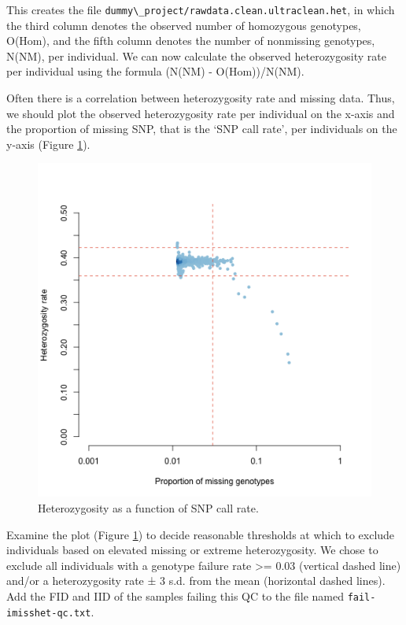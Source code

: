 \documentclass[
]{book}
\newcommand{\passthrough}[1]{#1}
\begin{document}
This creates the file \passthrough{\lstinline!dummy\_project/rawdata.clean.ultraclean.het!}, in which the third column denotes the observed number of homozygous genotypes, O(Hom), and the fifth column denotes the number of nonmissing genotypes, N(NM), per individual. We can now calculate the observed heterozygosity rate per individual using the formula (N(NM) - O(Hom))/N(NM).

Often there is a correlation between heterozygosity rate and missing data. Thus, we should plot the observed heterozygosity rate per individual on the x-axis and the proportion of missing SNP, that is the `SNP call rate', per individuals on the y-axis (Figure \ref{fig:showheterozygosity}).

\begin{figure}[H]

{\centering \includegraphics[width=0.85\linewidth]{img/_gwas_dummy/show-heterozygosity} 

}

\caption{Heterozygosity as a function of SNP call rate.}\label{fig:showheterozygosity}
\end{figure}

Examine the plot (Figure \ref{fig:showheterozygosity}) to decide reasonable thresholds at which to exclude individuals based on elevated missing or extreme heterozygosity. We chose to exclude all individuals with a genotype failure rate \textgreater= 0.03 (vertical dashed line) and/or a heterozygosity rate ± 3 s.d. from the mean (horizontal dashed lines). Add the FID and IID of the samples failing this QC to the file named \passthrough{\lstinline!fail-imisshet-qc.txt!}.
\end{document}
